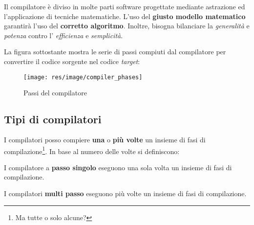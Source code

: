 Il compilatore è diviso in molte parti software progettate mediante astrazione
ed l'applicazione di tecniche matematiche. L'uso del \textbf{giusto modello
matematico} garantirà l'uso del \textbf{corretto algoritmo}. Inoltre, bisogna
bilanciare la \textit{generalità} e \textit{potenza} contro l'
\textit{efficienza} e \textit{semplicità}.

La figura sottostante mostra le serie di passi compiuti dal compilatore per
convertire il codice sorgente nel codice \textit{target}:

\begin{figure}[H]
\begin{center}
\texttt{[image: res/image/compiler\_phases]}
\caption{Passi del compilatore}
\label{fig:compiler_phases}
\end{center}
\end{figure}

\subsection{Tipi di compilatori}
\label{sec:tipi_compilatori}
I compilatori posso compiere \textbf{una} o \textbf{più volte} un insieme di
fasi di compilazione\footnote{Ma tutte o solo alcune?}. In base al numero delle
volte si definiscono:

\begin{definition}
I compilatore a \textbf{passo singolo} eseguono una sola volta un insieme di
fasi di compilazione.
\end{definition}

\begin{definition}
I compilatori \textbf{multi passo} eseguono più volte un insieme di fasi di
compilazione.
\end{definition}

